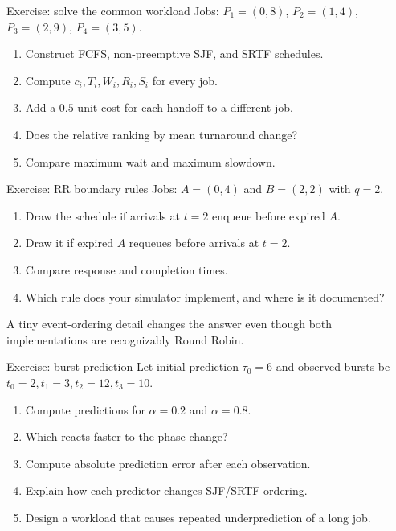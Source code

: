 \documentclass[aspectratio=169,11pt]{beamer}
\begin{document}
\begin{frame}{Exercise: solve the common workload}
  Jobs: $P_1=(0,8)$, $P_2=(1,4)$, $P_3=(2,9)$, $P_4=(3,5)$.
  \begin{enumerate}
    \item Construct FCFS, non-preemptive SJF, and SRTF schedules.
    \item Compute $c_i,T_i,W_i,R_i,S_i$ for every job.
    \item Add a $0.5$ unit cost for each handoff to a different job.
    \item Does the relative ranking by mean turnaround change?
    \item Compare maximum wait and maximum slowdown.
  \end{enumerate}
\end{frame}

\begin{frame}{Exercise: RR boundary rules}
  Jobs: $A=(0,4)$ and $B=(2,2)$ with $q=2$.
  \begin{enumerate}
    \item Draw the schedule if arrivals at $t=2$ enqueue before expired $A$.
    \item Draw it if expired $A$ requeues before arrivals at $t=2$.
    \item Compare response and completion times.
    \item Which rule does your simulator implement, and where is it documented?
  \end{enumerate}
  \begin{tcolorbox}[title=Lesson]
    A tiny event-ordering detail changes the answer even though both implementations are recognizably Round Robin.
  \end{tcolorbox}
\end{frame}

\begin{frame}{Exercise: burst prediction}
  Let initial prediction $\tau_0=6$ and observed bursts be $t_0=2,t_1=3,t_2=12,t_3=10$.
  \begin{enumerate}
    \item Compute predictions for $\alpha=0.2$ and $\alpha=0.8$.
    \item Which reacts faster to the phase change?
    \item Compute absolute prediction error after each observation.
    \item Explain how each predictor changes SJF/SRTF ordering.
    \item Design a workload that causes repeated underprediction of a long job.
  \end{enumerate}
\end{frame}
\end{document}
